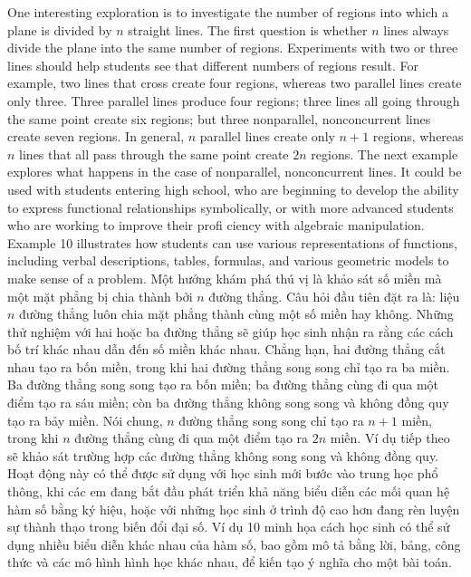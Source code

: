 \documentclass[
  10pt,
  a4paper,
  landscape,
  twoside,
  openany
]{scrbook}
\newcommand{\EN}[1]{#1}
\newcommand{\VI}[1]{#1}
\newcommand{\NOTE}[1]{#1}
\newcounter{example}
\begin{document}
\TriPara
{
\EN{One interesting exploration is to investigate the number of regions into which a plane is divided by $n$ straight lines. The first question is whether $n$ lines always divide the plane into the same number of regions. Experiments with two or three lines should help students see that different numbers of regions result. For example, two lines that cross create four regions, whereas two parallel lines create only three. Three parallel lines produce four regions; three lines all going through the same point create six regions; but three nonparallel, nonconcurrent lines create seven regions. In general, $n$ parallel lines create only $n + 1$ regions, whereas $n$ lines that all pass through the same point create $2n$ regions. The next example explores what happens in the case of nonparallel, nonconcurrent lines. It could be used with students entering high school, who are beginning to develop the ability to express functional relationships symbolically, or with more advanced students who are working to improve their profi ciency with algebraic manipulation. Example 10 illustrates how students can use various representations of functions, including verbal descriptions, tables, formulas, and various geometric models to make sense of a problem.}
}
{
\VI{Một hướng khám phá thú vị là khảo sát số miền mà một mặt phẳng bị chia thành bởi $n$ đường thẳng. Câu hỏi đầu tiên đặt ra là: liệu $n$ đường thẳng luôn chia mặt phẳng thành cùng một số miền hay không. Những thử nghiệm với hai hoặc ba đường thẳng sẽ giúp học sinh nhận ra rằng các cách bố trí khác nhau dẫn đến số miền khác nhau. Chẳng hạn, hai đường thẳng cắt nhau tạo ra bốn miền, trong khi hai đường thẳng song song chỉ tạo ra ba miền. Ba đường thẳng song song tạo ra bốn miền; ba đường thẳng cùng đi qua một điểm tạo ra sáu miền; còn ba đường thẳng không song song và không đồng quy tạo ra bảy miền. Nói chung, $n$ đường thẳng song song chỉ tạo ra $n+1$ miền, trong khi $n$ đường thẳng cùng đi qua một điểm tạo ra $2n$ miền. Ví dụ tiếp theo sẽ khảo sát trường hợp các đường thẳng không song song và không đồng quy. Hoạt động này có thể được sử dụng với học sinh mới bước vào trung học phổ thông, khi các em đang bắt đầu phát triển khả năng biểu diễn các mối quan hệ hàm số bằng ký hiệu, hoặc với những học sinh ở trình độ cao hơn đang rèn luyện sự thành thạo trong biến đổi đại số. Ví dụ 10 minh họa cách học sinh có thể sử dụng nhiều biểu diễn khác nhau của hàm số, bao gồm mô tả bằng lời, bảng, công thức và các mô hình hình học khác nhau, để kiến tạo ý nghĩa cho một bài toán.}
}
{
\NOTE{}
}
\end{document}
